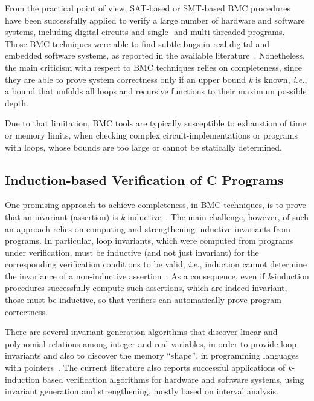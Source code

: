 \documentclass{acm_sen_article}
\begin{document}
From the practical point of view, SAT-based or SMT-based BMC procedures have been successfully applied to verify a large number of hardware and software systems, including digital circuits and single- and multi-threaded programs. Those BMC techniques were able to find subtle bugs in real digital and embedded software systems, as reported in the available literature~\cite{Clarke04,MerzFS12,CordeiroF11,Ivancic05,Cordeiro12}. Nonetheless, the main criticism with respect to BMC techniques relies on completeness, since they are able to prove system correctness only if an upper bound \textit{k} is known, {\it i.e.}, a bound that unfolds all loops and recursive functions to their maximum possible depth. 

Due to that limitation, BMC tools are typically susceptible to exhaustion of time or memory limits, when checking complex circuit-implementations or programs with loops, whose bounds are too large or cannot be statically determined.  

\subsection{Induction-based Verification of C Programs}

One promising approach to achieve completeness, in BMC techniques, is to prove that an invariant (assertion) is \textit{k}-inductive~\cite{EenS03,Sheera00}. The main challenge, however, of such an approach relies on computing and strengthening inductive invariants from programs. In particular, loop invariants, which were computed from programs under verification, must be inductive (and not just invariant) for the corresponding verification conditions to be valid, {\it i.e.}, induction cannot determine the invariance of a non-inductive assertion~\cite{Bradley07}. As a consequence, even if \textit{k}-induction procedures successfully compute such assertions, which are indeed invariant, those must be inductive, so that verifiers can automatically prove program correctness.

There are several invariant-generation algorithms that discover linear and polynomial relations among integer and real variables, in order to provide loop invariants and also to discover the memory ``shape'', in programming languages with pointers~\cite{pips:2013,Henry:2012}. The current literature also reports successful applications of \textit{k}-induction based verification algorithms for hardware and software systems, using invariant generation and strengthening, mostly based on interval analysis. 
\end{document}
